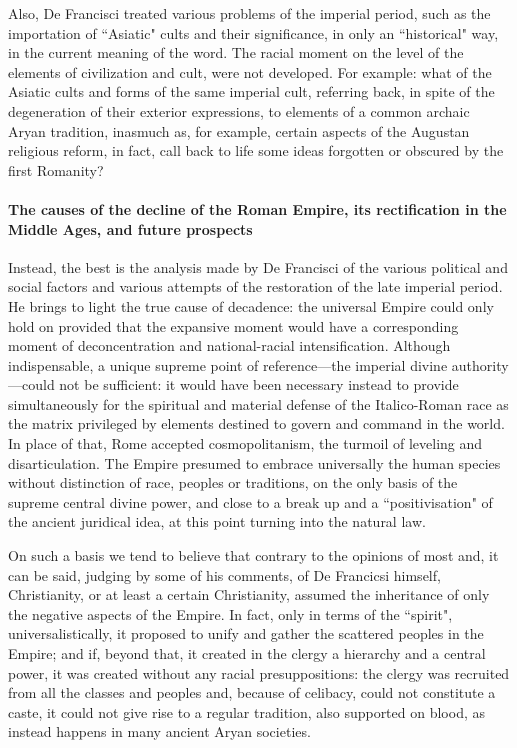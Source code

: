 Also, De Francisci treated various problems of the imperial period, such as the importation of ``Asiatic" cults and their significance, in only an ``historical" way, in the current meaning of the word. The racial moment on the level of the elements of civilization and cult, were not developed. For example: what of the Asiatic cults and forms of the same imperial cult, referring back, in spite of the degeneration of their exterior expressions, to elements of a common archaic Aryan tradition, inasmuch as, for example, certain aspects of the Augustan religious reform, in fact, call back to life some ideas forgotten or obscured by the first Romanity?

\paragraph*{The causes of the decline of the Roman Empire, its rectification in the Middle Ages, and future prospects}

Instead, the best is the analysis made by De Francisci of the various political and social factors and various attempts of the restoration of the late imperial period. He brings to light the true cause of decadence: the universal Empire could only hold on provided that the expansive moment would have a corresponding moment of deconcentration and national-racial intensification. Although indispensable, a unique supreme point of reference—the imperial divine authority—could not be sufficient: it would have been necessary instead to provide simultaneously for the spiritual and material defense of the Italico-Roman race as the matrix privileged by elements destined to govern and command in the world. In place of that, Rome accepted cosmopolitanism, the turmoil of leveling and disarticulation. The Empire presumed to embrace universally the human species without distinction of race, peoples or traditions, on the only basis of the supreme central divine power, and close to a break up and a ``positivisation" of the ancient juridical idea, at this point turning into the natural law.

On such a basis we tend to believe that contrary to the opinions of most and, it can be said, judging by some of his comments, of De Francicsi himself, Christianity, or at least a certain Christianity, assumed the inheritance of only the negative aspects of the Empire. In fact, only in terms of the ``spirit", universalistically, it proposed to unify and gather the scattered peoples in the Empire; and if, beyond that, it created in the clergy a hierarchy and a central power, it was created without any racial presuppositions: the clergy was recruited from all the classes and peoples and, because of celibacy, could not constitute a caste, it could not give rise to a regular tradition, also supported on blood, as instead happens in many ancient Aryan societies.

